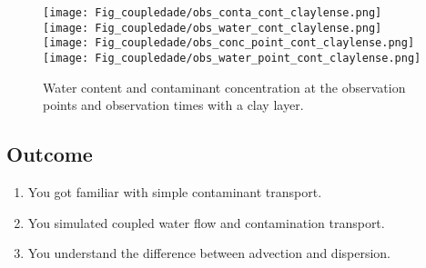 \begin{figure}[!h]
	\centering
	\texttt{[image: Fig\_coupledade/obs\_conta\_cont\_claylense.png]}
	\texttt{[image: Fig\_coupledade/obs\_water\_cont\_claylense.png]}
	\texttt{[image: Fig\_coupledade/obs\_conc\_point\_cont\_claylense.png]}
	\texttt{[image: Fig\_coupledade/obs\_water\_point\_cont\_claylense.png]}
	\caption{Water content  and contaminant concentration at the observation points and observation times with a clay layer.}
\end{figure}


\newpage
\newpage
\newpage
\newpage
\pagebreak
\subsection{Outcome}
\begin{enumerate}
\item You got familiar with simple contaminant transport.
\item You simulated coupled water flow and contamination transport.
\item You understand the difference between advection and dispersion.
\end{enumerate}
